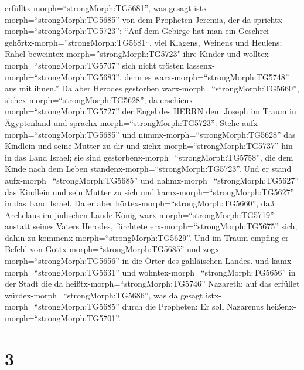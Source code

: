 erfülltx-morph=``strongMorph:TG5681'', was gesagt
istx-morph=``strongMorph:TG5685'' von dem Propheten Jeremia, der da
sprichtx-morph=``strongMorph:TG5723'':  ``Auf dem Gebirge
hat man ein Geschrei gehörtx-morph=''strongMorph:TG5681``, viel Klagens,
Weinens und Heulens; Rahel beweintex-morph=''strongMorph:TG5723" ihre
Kinder und wolltex-morph=``strongMorph:TG5707'' sich nicht trösten
lassenx-morph=``strongMorph:TG5683'', denn es
warx-morph=``strongMorph:TG5748'' aus mit ihnen.''  Da aber
Herodes gestorben warx-morph=``strongMorph:TG5660'',
siehex-morph=``strongMorph:TG5628'', da
erschienx-morph=``strongMorph:TG5727'' der Engel des HERRN dem Joseph im
Traum in Ägyptenland  und
sprachx-morph=``strongMorph:TG5723'': Stehe
aufx-morph=``strongMorph:TG5685'' und nimmx-morph=``strongMorph:TG5628''
das Kindlein und seine Mutter zu dir und
ziehx-morph=``strongMorph:TG5737'' hin in das Land Israel; sie sind
gestorbenx-morph=``strongMorph:TG5758'', die dem Kinde nach dem Leben
standenx-morph=``strongMorph:TG5723''.  Und er stand
aufx-morph=``strongMorph:TG5685'' und nahmx-morph=``strongMorph:TG5627''
das Kindlein und sein Mutter zu sich und
kamx-morph=``strongMorph:TG5627'' in das Land Israel.  Da
er aber hörtex-morph=``strongMorph:TG5660'', daß Archelaus im jüdischen
Lande König warx-morph=``strongMorph:TG5719'' anstatt seines Vaters
Herodes, fürchtete erx-morph=``strongMorph:TG5675'' sich, dahin zu
kommenx-morph=``strongMorph:TG5629''. Und im Traum empfing er Befehl von
Gottx-morph=``strongMorph:TG5685'' und zogx-morph=``strongMorph:TG5656''
in die Örter des galiläischen Landes.  und
kamx-morph=``strongMorph:TG5631'' und
wohntex-morph=``strongMorph:TG5656'' in der Stadt die da
heißtx-morph=``strongMorph:TG5746'' Nazareth; auf das erfüllet
würdex-morph=``strongMorph:TG5686'', was da gesagt
istx-morph=``strongMorph:TG5685'' durch die Propheten: Er soll Nazarenus
heißenx-morph=``strongMorph:TG5701''.

\hypertarget{section-2}{%
\section{3}\label{section-2}}

